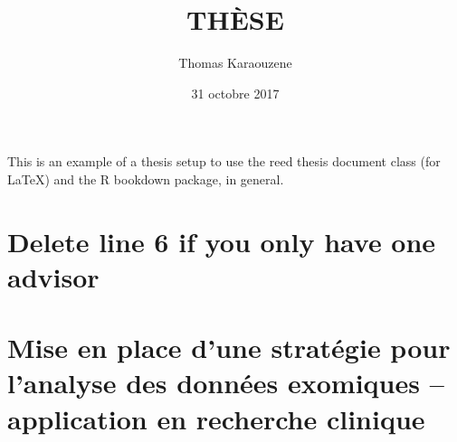 \documentclass[12pt,twoside]{reedthesis}
\title{THÈSE}
\author{Thomas Karaouzene}
\date{31 octobre 2017}
\theoremstyle{definition}
\theoremstyle{definition}
\theoremstyle{remark}
\begin{document}
      \maketitle
  
  \frontmatter %
  \pagestyle{empty} %

  
      \begin{preface}
      This is an example of a thesis setup to use the reed thesis document
      class (for LaTeX) and the R bookdown package, in general.
    \end{preface}
  
      \hypersetup{linkcolor=black}
    \setcounter{tocdepth}{3}
    \tableofcontents
  
      \listoftables
  
      \listoffigures
  
  
  
  \mainmatter %
  \pagestyle{fancyplain} %

  \chapter{Delete line 6 if you only have one
  advisor}\label{delete-line-6-if-you-only-have-one-advisor}
  
  \chapter{Mise en place d'une stratégie pour l'analyse des données
  exomiques -- application en recherche
  clinique}\label{mise-en-place-dune-strategie-pour-lanalyse-des-donnees-exomiques-application-en-recherche-clinique}
  
  \newpage
  
\end{document}
